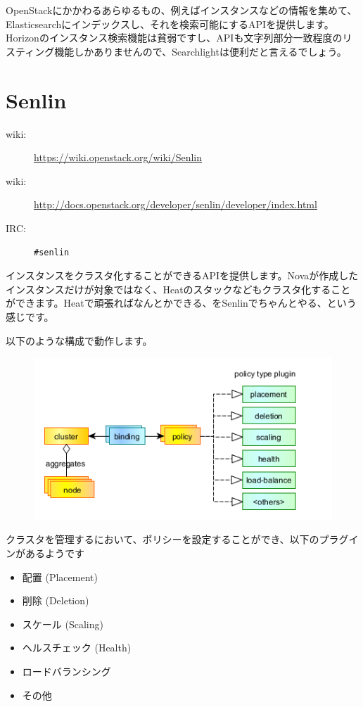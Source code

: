 OpenStackにかかわるあらゆるもの、例えばインスタンスなどの情報を集めて、Elasticsearchにインデックスし、それを検索可能にするAPIを提供します。Horizonのインスタンス検索機能は貧弱ですし、APIも文字列部分一致程度のリスティング機能しかありませんので、Searchlightは便利だと言えるでしょう。

\section{Senlin}

\begin{description}
	\item[wiki:] \url{https://wiki.openstack.org/wiki/Senlin}
	\item[wiki:] \url{http://docs.openstack.org/developer/senlin/developer/index.html}
	\item[IRC:] \verb|#senlin|
\end{description}

インスタンスをクラスタ化することができるAPIを提供します。Novaが作成したインスタンスだけが対象ではなく、Heatのスタックなどもクラスタ化することができます。Heatで頑張ればなんとかできる、をSenlinでちゃんとやる、という感じです。

以下のような構成で動作します。

\begin{figure}[htb]
	\begin{center}
		\includegraphics[width=\textwidth]{img/Senlin-policies.png}
	\end{center}
\end{figure}

クラスタを管理するにおいて、ポリシーを設定することができ、以下のプラグインがあるようです

\begin{itemize}
	\item 配置 (Placement)
	\item 削除 (Deletion)
	\item スケール (Scaling)
	\item ヘルスチェック (Health)
	\item ロードバランシング
	\item その他
\end{itemize}

